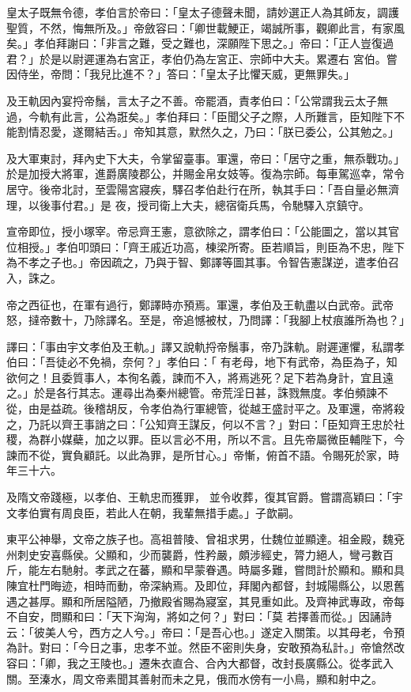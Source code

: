 \begin{pinyinscope}
 皇太子既無令德，孝伯言於帝曰：「皇太子德聲未聞，請妙選正人為其師友，調護聖質，不然，悔無所及。」帝斂容曰：「卿世載鯁正，竭誠所事，觀卿此言，有家風矣。」孝伯拜謝曰：「非言之難，受之難也，深願陛下思之。」帝曰：「正人豈復過君？」於是以尉遲運為右宮正，孝伯仍為左宮正、宗師中大夫。累遷右
 宮伯。嘗因侍坐，帝問：「我兒比進不？」答曰：「皇太子比懼天威，更無罪失。」



 及王軌因內宴捋帝鬚，言太子之不善。帝罷酒，責孝伯曰：「公常謂我云太子無過，今軌有此言，公為誑矣。」孝伯拜曰：「臣聞父子之際，人所難言，臣知陛下不能割情忍愛，遂爾結舌。」帝知其意，默然久之，乃曰：「朕已委公，公其勉之。」



 及大軍東討，拜內史下大夫，令掌留臺事。軍還，帝曰：「居守之重，無忝戰功。」於是加授大將軍，進爵廣陵郡公，并賜金帛女妓等。復為宗師。每車駕巡幸，常令居守。後帝北討，至雲陽宮寢疾，驛召孝伯赴行在所，執其手曰：「吾自量必無濟理，以後事付君。」是
 夜，授司衛上大夫，總宿衛兵馬，令馳驛入京鎮守。



 宣帝即位，授小塚宰。帝忌齊王憲，意欲除之，謂孝伯曰：「公能圖之，當以其官位相授。」孝伯叩頭曰：「齊王戚近功高，棟梁所寄。臣若順旨，則臣為不忠，陛下為不孝之子也。」帝因疏之，乃與于智、鄭譯等圖其事。令智告憲謀逆，遣孝伯召入，誅之。



 帝之西征也，在軍有過行，鄭譯時亦預焉。軍還，孝伯及王軌盡以白武帝。武帝怒，撻帝數十，乃除譯名。至是，帝追憾被杖，乃問譯：「我腳上杖痕誰所為也？」



 譯曰：「事由宇文孝伯及王軌。」譯又說軌捋帝鬚事，帝乃誅軌。尉遲運懼，私謂孝伯曰：「吾徒必不免禍，奈何？」孝伯曰：「
 有老母，地下有武帝，為臣為子，知欲何之！且委質事人，本徇名義，諫而不入，將焉逃死？足下若為身計，宜且遠之。」於是各行其志。運尋出為秦州總管。帝荒淫日甚，誅戮無度。孝伯頻諫不從，由是益疏。後稽胡反，令孝伯為行軍總管，從越王盛討平之。及軍還，帝將殺之，乃託以齊王事誚之曰：「公知齊王謀反，何以不言？」對曰：「臣知齊王忠於社稷，為群小媒蘗，加之以罪。臣以言必不用，所以不言。且先帝屬微臣輔陛下，今諫而不從，實負顧託。以此為罪，是所甘心。」帝慚，俯首不語。令賜死於家，時年三十六。



 及隋文帝踐極，以孝伯、王軌忠而獲罪，
 並令收葬，復其官爵。嘗謂高穎曰：「宇文孝伯實有周良臣，若此人在朝，我輩無措手處。」子歆嗣。



 東平公神舉，文帝之族子也。高祖普陵、曾祖求男，仕魏位並顯達。祖金殿，魏兗州刺史安喜縣侯。父顯和，少而襲爵，性矜嚴，頗涉經史，膂力絕人，彎弓數百斤，能左右馳射。孝武之在蕃，顯和早蒙眷遇。時屬多難，嘗問計於顯和。顯和具陳宜杜門晦迹，相時而動，帝深納焉。及即位，拜閣內都督，封城陽縣公，以恩舊遇之甚厚。顯和所居隘陋，乃撤殿省賜為寢室，其見重如此。及齊神武專政，帝每不自安，問顯和曰：「天下洶洶，將如之何？」對曰：「莫
 若擇善而從。」因誦詩云：「彼美人兮，西方之人兮。」帝曰：「是吾心也。」遂定入關策。以其母老，令預為計。對曰：「今日之事，忠孝不並。然臣不密則失身，安敢預為私計。」帝愴然改容曰：「卿，我之王陵也。」遷朱衣直合、合內大都督，改封長廣縣公。從孝武入關。至溱水，周文帝素聞其善射而未之見，俄而水傍有一小鳥，顯和射中之。




\end{pinyinscope}
